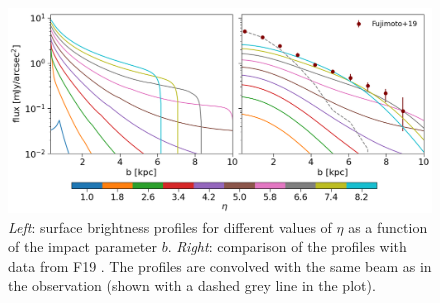 \begin{figure}
    \centering
    \includegraphics[width=1.0\textwidth]{plots/emission_final.png}
    \caption{\textit{Left}: \CII surface brightness profiles for different values of $\eta$ as a function of the impact parameter $b$. \textit{Right}: comparison of the profiles with data from F19 \citep{Fujimoto19}. The profiles are convolved with the same beam as in the observation (shown with a dashed grey line in the plot).
    \label{fig:global_emission}
    }
\end{figure}






